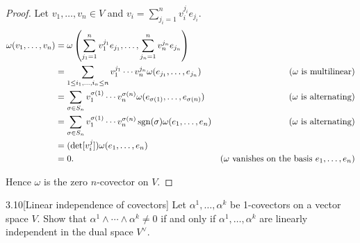 \begin{proof}
	Let \( v_{1}, \ldots, v_{n} \in V \) and \( v_{i} = \sum^{n}_{j_{i}=1} v_{i}^{j_{i}} e_{j_{i}} \).
	\begingroup
	\allowdisplaybreaks%
	\begin{align*}
		\omega(v_{1}, \ldots, v_{n}) & = \omega\left(\sum^{n}_{j_{1}=1} v_{1}^{j_{1}} e_{j_{1}}, \ldots, \sum^{n}_{j_{n}=1} v_{n}^{j_{n}} e_{j_{n}}\right)                                                                              \\
		                             & = \sum_{1\leq i_{1}, \ldots, i_{n} \leq n} v_{1}^{j_{1}}\cdots v_{n}^{j_{n}}\omega(e_{j_{1}}, \ldots, e_{j_{n}})          & \text{(\(\omega\) is multilinear)}                                   \\
		                             & = \sum_{\sigma\in S_{n}} v_{1}^{\sigma(1)}\cdots v_{n}^{\sigma(n)} \omega(e_{\sigma(1)}, \ldots, e_{\sigma(n)})           & \text{(\(\omega\) is alternating)}                                   \\
		                             & = \sum_{\sigma\in S_{n}} v_{1}^{\sigma(1)}\cdots v_{n}^{\sigma(n)}\operatorname{sgn}(\sigma) \omega(e_{1}, \ldots, e_{n}) & \text{(\(\omega\) is alternating)}                                   \\
		                             & = (\det[v_{i}^{j}])\omega(e_{1}, \ldots, e_{n})                                                                                                                                                  \\
		                             & = 0.                                                                                                                      & \text{(\(\omega\) vanishes on the basis \( e_{1}, \ldots, e_{n} \))}
	\end{align*}
	\endgroup

	Hence \( \omega \) is the zero \( n \)-covector on \( V \).
\end{proof}

\begin{problem}{3.10}[Linear independence of covectors]\label{problem:3.10}
Let \( \alpha^{1}, \ldots, \alpha^{k} \) be 1-covectors on a vector space \( V \). Show that \( \alpha^{1} \land \cdots \land \alpha^{k} \neq 0 \) if and only if \( \alpha^{1}, \ldots, \alpha^{k} \) are linearly independent in the dual space \( V^{\vee} \).
\end{problem}

